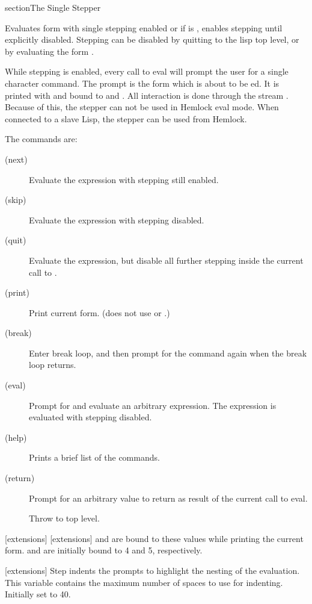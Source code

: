
\begin{ignore}
section{The Single Stepper}

Evaluates form with single stepping enabled or if  is ,
enables stepping until explicitly disabled.  Stepping can be
disabled by quitting to the lisp top level, or by evaluating the form
.

While stepping is enabled, every call to eval will prompt the user for
a single character command.  The prompt is the form which is about to
be ed.  It is printed with  and
 bound to  and
.  All interaction is done through the stream
.  Because of this, the stepper can not be used in Hemlock
eval mode.  When connected to a slave Lisp, the stepper can be used
from Hemlock.

The commands are:
\begin{description}

\item[ (next)]
Evaluate the expression with stepping still enabled.

\item[ (skip)]
Evaluate the expression with stepping disabled.

\item[ (quit)]
Evaluate the expression, but disable all further
stepping inside the current call to .

\item[ (print)]
Print current form.  (does not use
 or .)

\item[ (break)]
Enter break loop, and then prompt for the command
again when the break loop returns.

\item[ (eval)]
Prompt for and evaluate an arbitrary expression.
The expression is evaluated with stepping disabled.

\item[ (help)]
Prints a brief list of the commands.

\item[ (return)]
Prompt for an arbitrary value to return as result
of the current call to eval.

\item[]
Throw to top level.
\end{description}
\enddefmac

[extensions]
[extensions]
 and  are bound to these values while
printing the current form.   and
 are initially bound to 4 and 5, respectively.
\enddefvar

[extensions]
Step indents the prompts to highlight the nesting of the evaluation.
This variable contains the maximum number of spaces to use for
indenting.  Initially set to 40.
\enddefvar

\end{ignore}


